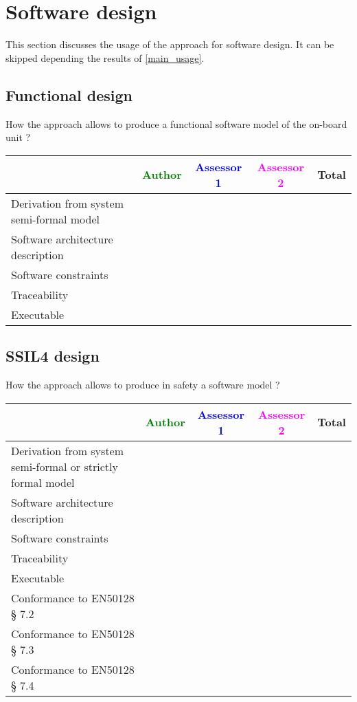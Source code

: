\section{Software design}
This section discusses the usage of the approach for software design.
It can be skipped depending the results of \ref{main_usage}.

\subsection{Functional design}

How the approach allows to  produce a functional software model of the on-board unit ?

\begin{tabular}{|l | c | c | c | c|}
\hline
& \textcolor{green}{Author} & \textcolor{blue}{Assessor 1} & \textcolor{magenta}{Assessor 2} & Total \\
\hline
Derivation from system semi-formal model  & & & &  \\
\hline 
Software architecture description  & & & &  \\
\hline
Software constraints  & & & &  \\
\hline
Traceability  & & & &  \\
\hline
Executable  & & & &  \\
\hline
\end{tabular}

\subsection{SSIL4 design}

How the approach allows to  produce in safety a software model ?

\begin{tabular}{|l | c | c | c | c|}
\hline
& \textcolor{green}{Author} & \textcolor{blue}{Assessor 1} & \textcolor{magenta}{Assessor 2} & Total \\
\hline
Derivation from system semi-formal or strictly formal model  & & & &  \\
\hline 
Software architecture description  & & & &  \\
\hline
Software constraints  & & & &  \\
\hline
Traceability  & & & &  \\
\hline
Executable  & & & &  \\
\hline
Conformance to EN50128 § 7.2  & & & &  \\
\hline
Conformance to EN50128 § 7.3  & & & &  \\
\hline
Conformance to EN50128 § 7.4  & & & &  \\
\hline
\end{tabular}

